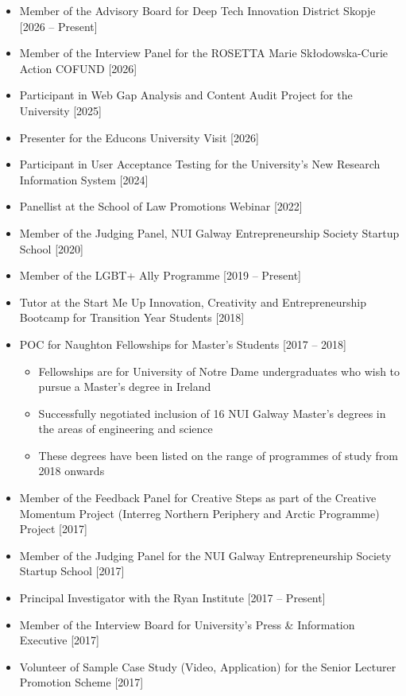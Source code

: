 \documentclass[10pt,a4paper]{res} %
\begin{document}
\begin{resume}
\begin{itemize} \itemsep -2pt
\item Member of the Advisory Board for Deep Tech Innovation District Skopje [2026 -- Present]
\item Member of the Interview Panel for the ROSETTA Marie Sk\l{}odowska-Curie Action COFUND [2026]
\item Participant in Web Gap Analysis and Content Audit Project for the University [2025]
\item Presenter for the Educons University Visit [2026]
\item Participant in User Acceptance Testing for the University's New Research Information System [2024]
\item Panellist at the School of Law Promotions Webinar [2022]
\item Member of the Judging Panel, NUI Galway Entrepreneurship Society Startup School [2020]
\item Member of the LGBT+ Ally Programme [2019 -- Present]
\item Tutor at the Start Me Up Innovation, Creativity and Entrepreneurship Bootcamp for Transition Year Students [2018]
\item POC for Naughton Fellowships for Master's Students [2017 -- 2018]
\begin{itemize} \itemsep -2pt
\item Fellowships are for University of Notre Dame undergraduates who wish to pursue a Master's degree in Ireland
\item Successfully negotiated inclusion of 16 NUI Galway Master's degrees in the areas of engineering and science
\item These degrees have been listed on the range of programmes of study from 2018 onwards
\end{itemize}
\item Member of the Feedback Panel for Creative Steps as part of the Creative Momentum Project (Interreg Northern Periphery and Arctic Programme) Project [2017]
\item Member of the Judging Panel for the NUI Galway Entrepreneurship Society Startup School [2017]
\item Principal Investigator with the Ryan Institute [2017 -- Present]
\item Member of the Interview Board for University's Press \& Information Executive [2017]
\item Volunteer of Sample Case Study (Video, Application) for the Senior Lecturer Promotion Scheme [2017]

\end{itemize}
\end{resume}
\end{document}
